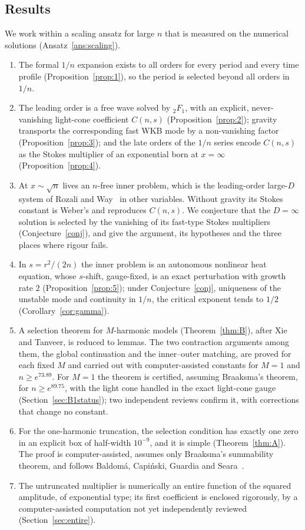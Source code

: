 \documentclass{amsart}
\numberwithin{equation}{section}
\theoremstyle{plain}
\theoremstyle{definition}
\theoremstyle{remark}
\begin{document}
\subsection*{Results}
We work within a scaling ansatz for large $n$ that is measured on the numerical solutions (Ansatz~\ref{ans:scaling}).
\begin{enumerate}[leftmargin=2em]
\item The formal $1/n$ expansion exists to all orders for every period and every time profile
(Proposition~\ref{prop:1}), so the period is selected beyond all orders in $1/n$.
\item The leading order is a free wave solved by ${}_2F_1$, with an explicit, never-vanishing light-cone coefficient
$C(n,s)$ (Proposition~\ref{prop:2}); gravity transports the corresponding fast WKB mode by a non-vanishing factor
(Proposition~\ref{prop:3}); and the late orders of the $1/n$ series encode $C(n,s)$ as the Stokes multiplier of an
exponential born at $x = \infty$ (Proposition~\ref{prop:4}).
\item At $x \sim \sqrt n$ lives an $n$-free inner problem, which is the leading-order large-$D$ system of Rozali and
Way~\cite{RozaliWay2018} in other variables. Without gravity its Stokes constant is Weber's and reproduces $C(n,s)$. We
conjecture that the $D = \infty$ solution is selected by the vanishing of its fast-type Stokes multipliers
(Conjecture~\ref{conj}), and give the argument, its hypotheses and the three places where rigour fails.
\item In $s = r^2/(2n)$ the inner problem is an autonomous nonlinear heat equation, whose $s$-shift, gauge-fixed, is an
exact perturbation with growth rate $2$ (Proposition~\ref{prop:5}); under Conjecture~\ref{conj}, uniqueness of the
unstable mode and continuity in $1/n$, the critical exponent tends to $1/2$ (Corollary~\ref{cor:gamma}).
\item A selection theorem for $M$-harmonic models (Theorem~\ref{thm:B}), after Xie and Tanveer, is reduced to lemmas.
The two contraction arguments among them, the global continuation and the inner--outer matching, are proved for each
fixed $M$ and carried out with computer-assisted constants for $M = 1$ and $n \ge e^{73.89}$. For $M = 1$ the theorem is
certified, assuming Braaksma's theorem, for $n \ge e^{89.75}$, with the light cone handled in the exact light-cone gauge
(Section~\ref{sec:B1status}); two independent reviews confirm it, with corrections that change no constant.
\item For the one-harmonic truncation, the selection condition has exactly one zero in an explicit box of half-width
$10^{-9}$, and it is simple (Theorem~\ref{thm:A}). The proof is computer-assisted, assumes only Braaksma's summability
theorem, and follows Baldom\'a, Capi\'nski, Guardia and Seara~\cite{BaldomaCapinskiGuardiaSeara2023}.
\item The untruncated multiplier is numerically an entire function of the squared amplitude, of exponential type; its
first coefficient is enclosed rigorously, by a computer-assisted computation not yet independently reviewed
(Section~\ref{sec:entire}).
\end{enumerate}
\end{document}
